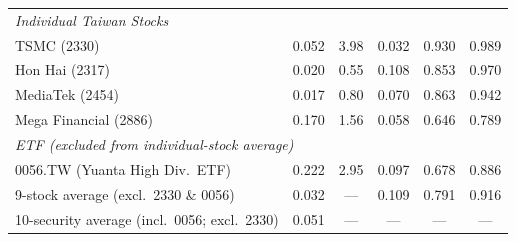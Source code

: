 \begin{table}[H]
\begin{tabular}{lccccc}
\multicolumn{6}{l}{\textit{Individual Taiwan Stocks}} \\
TSMC (2330) & 0.052 & 3.98 & 0.032 & 0.930 & 0.989 \\ %
Hon Hai (2317) & 0.020 & 0.55 & 0.108 & 0.853 & 0.970 \\ %
MediaTek (2454) & 0.017 & 0.80 & 0.070 & 0.863 & 0.942 \\ %
Mega Financial (2886) & 0.170 & 1.56 & 0.058 & 0.646 & 0.789 \\ %
\midrule
\multicolumn{6}{l}{\textit{ETF (excluded from individual-stock average)}} \\
0056.TW (Yuanta High Div.\ ETF) & 0.222 & 2.95 & 0.097 & 0.678 & 0.886 \\ %
\midrule
9-stock average (excl.\ 2330 \& 0056) & 0.032 & --- & 0.109 & 0.791 & 0.916 \\ %
10-security average (incl.\ 0056; excl.\ 2330) & 0.051 & --- & --- & --- & --- \\ %
\bottomrule
\end{tabular}
\begin{flushleft}

\end{flushleft}
\end{table}
